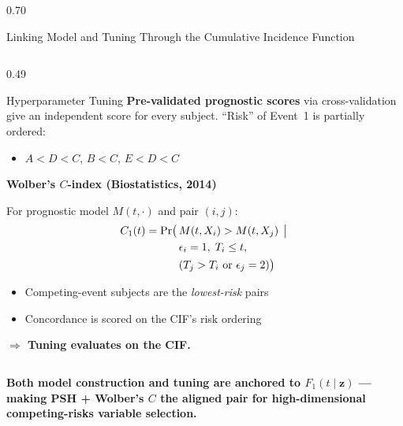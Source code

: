 \documentclass[final]{beamer}
\begin{document}
\begin{frame}[t]
\begin{columns}[t, onlytextwidth]
\begin{column}{0.70\textwidth}
\begin{block}{Linking Model and Tuning Through the Cumulative Incidence Function}
\begin{columns}[T]
\begin{column}{0.49\textwidth}
\begin{block}{Hyperparameter Tuning}
\textbf{Pre-validated prognostic scores} via cross-validation give an independent score for every subject. ``Risk'' of Event~1 is partially ordered:
\begin{itemize}
  \item $A < D < C$, \quad $B < C$, \quad $E < D < C$
\end{itemize}
\textbf{Wolber's $C$-index (Biostatistics, 2014)}
\begin{tcolorbox}[colback=red!5!white, colframe=red!75!black,
                  title=CIF-Aligned Concordance]
For prognostic model $M(t,\cdot)$ and pair $(i,j)$:
\vspace{-0.4em}
\begin{align*}
C_1(t) = \Pr\bigl(\,& M(t,X_i) > M(t,X_j) \,\bigm|\, \\
                   & \epsilon_i=1,\; T_i \le t,\; \\
                   & (T_j > T_i \text{ or } \epsilon_j = 2)\bigr)
\end{align*}
\end{tcolorbox}
\begin{itemize}
  \item Competing-event subjects are the \emph{lowest-risk} pairs
  \item Concordance is scored on the CIF's risk ordering
\end{itemize}
\textbf{$\Rightarrow$ Tuning evaluates on the CIF.}
\end{block}
\end{column}

\end{columns}

\vspace{0.3cm}

\begin{tcolorbox}[colback=UUred!90!black, colframe=UUred!90!black,
                  coltext=white, boxrule=0mm, sharp corners,
                  left=5mm, right=5mm, top=2mm, bottom=2mm]
\begin{center}
\textbf{Both model construction and tuning are anchored to $F_1(t\mid\mathbf{z})$ —
making PSH + Wolber's $C$ the aligned pair for high-dimensional competing-risks variable selection.}
\end{center}
\end{tcolorbox}


\end{block}
\end{column}
\end{columns}
\end{frame}
\end{document}
